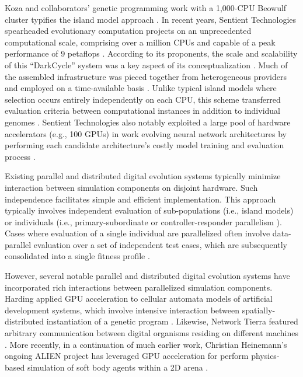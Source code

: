 Koza and collaborators’ genetic programming work with a 1,000-CPU Beowulf cluster typifies the island model approach \citep{bennett1999building}.
In recent years, Sentient Technologies spearheaded evolutionary computation projects on an unprecedented computational scale, comprising over a million CPUs and capable of a peak performance of 9 petaflops \citep{miikkulainen2019evolving}.
According to its proponents, the scale and scalability of this ``DarkCycle'' system was a key aspect of its conceptualization \citep{gilbert2015artificial}.
Much of the assembled infrastructure was pieced together from heterogeneous providers and employed on a time-available basis \citep{blondeau2009distributed}.
Unlike typical island models where selection occurs entirely independently on each CPU, this scheme transferred evaluation criteria between computational instances in addition to individual genomes \citep{hodjat2013distributed}.
Sentient Technologies also notably exploited a large pool of hardware accelerators (e.g., 100 GPUs) in work evolving neural network architectures by performing each candidate architecture's costly model training and evaluation process \citep{miikkulainen2019evolving}.

Existing parallel and distributed digital evolution systems typically minimize interaction between simulation components on disjoint hardware.
Such independence facilitates simple and efficient implementation.
This approach typically involves independent evaluation of sub-populations (i.e., island models) or individuals (i.e., primary-subordinate or controller-responder parallelism \citep{cantu2001master}).
Cases where evaluation of a single individual are parallelized often involve data-parallel evaluation over a set of independent test cases, which are subsequently consolidated into a single fitness profile \citep{harding2007fast_springer, langdon2019continuous}.

However, several notable parallel and distributed digital evolution systems have incorporated rich interactions between parallelized simulation components.
Harding applied GPU acceleration to cellular automata models of artificial development systems, which involve intensive interaction between spatially-distributed instantiation of a genetic program \citep{harding2007fast_ieee}.
Likewise, Network Tierra featured arbitrary communication between digital organisms residing on different machines \citep{ray1995proposal}.
More recently, in a continuation of much earlier work, Christian Heinemann's ongoing ALIEN project has leveraged GPU acceleration for perform physics-based simulation of soft body agents within a 2D arena \citep{heinemann2008artificial}.

